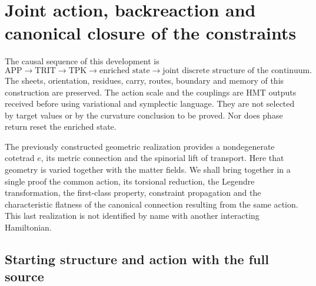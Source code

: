 \section{Joint action, backreaction and canonical closure of the constraints}
\label{hmtcuatro:accion-retroaccion-restricciones}

The causal sequence of this development is
\[
 \mathrm{APP}\longrightarrow\mathrm{TRIT}\longrightarrow\mathrm{TPK}
 \longrightarrow\text{enriched state}
 \longrightarrow\text{joint discrete structure of the continuum}.
\]
The sheets, orientation, residues, carry, routes, boundary and memory of this construction are preserved. The action scale and the couplings are HMT outputs received before using variational and symplectic language. They are not selected by target values or by the curvature conclusion to be proved. Nor does phase return reset the enriched state.

The previously constructed geometric realization provides a nondegenerate cotetrad \(e\), its metric connection and the spinorial lift of transport. Here that geometry is varied together with the matter fields. We shall bring together in a single proof the common action, its torsional reduction, the Legendre transformation, the first-class property, constraint propagation and the characteristic flatness of the canonical connection resulting from the same action. This last realization is not identified by name with another interacting Hamiltonian.

\subsection{Starting structure and action with the full source}
\label{hmtcuatro:datos-accion-total}

